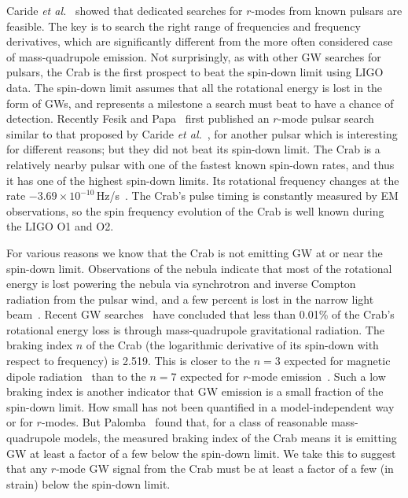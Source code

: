 \documentclass{ttuthes2007}
\begin{document}
Caride \textit{et al.}~\cite{Caride2019} showed that dedicated searches for
$r$-modes from known pulsars are feasible.
The key is to search the right range of frequencies and frequency derivatives,
which are significantly different from the more often considered case of
mass-quadrupole emission.
Not surprisingly, as with other \ac{GW} searches for pulsars, the Crab is the
first prospect to beat the spin-down limit using \ac{LIGO} data. The spin-down
limit assumes that all the rotational energy is
lost in the form of \acp{GW}, and represents a milestone a search must beat to
have a chance of detection.
Recently Fesik and Papa~\cite{Fesik2020} first published an $r$-mode pulsar
search similar to that proposed by Caride \textit{et al.}~\cite{Caride2019}, for another pulsar which is interesting for different reasons; but they
did not beat its spin-down limit.
The Crab is a relatively nearby pulsar with one of
the fastest known spin-down rates, and thus it has one of the highest spin-down
limits. Its rotational frequency changes at the rate
$-3.69\times10^{-10}$\,Hz/s~\cite{JodrellBankObservatory}. The Crab's pulse timing is constantly
measured by \ac{EM} observations, so the spin frequency evolution of the Crab is well known
during the LIGO \ac{O1} and \ac{O2}.

For various reasons we know that the Crab is not emitting \ac{GW} at or near the
spin-down limit.
Observations of the nebula indicate that most of the rotational energy is lost
powering the nebula via synchrotron and inverse Compton radiation from the
pulsar wind, and a few percent is lost in the narrow light
beam~\cite{B_hler_2014}. Recent \ac{GW} searches~\cite{Abbott_2019, O3}
have concluded that less than 0.01\% of the Crab's rotational energy loss is
through mass-quadrupole gravitational radiation.
The braking index $n$ of the Crab (the logarithmic derivative of its spin-down
with respect to frequency) is 2.519.
This is closer to the $n=3$ expected for magnetic dipole
radiation~\cite{Lyne_2014} than to the $n=7$ expected for
$r$-mode emission~\cite{Owen_1998}.
Such a low braking index is another indicator that \ac{GW} emission is a small
fraction of the spin-down limit.
How small has not been quantified in a model-independent way or for $r$-modes.
But Palomba~\cite{Palomba2000} found that, for a class of reasonable
mass-quadrupole models, the measured braking index of the Crab means it is
emitting \ac{GW} at least a factor of a few below the spin-down limit.
We take this to suggest that any $r$-mode \ac{GW} signal from the Crab must be
at least a factor of a few (in strain) below the spin-down limit.
\end{document}
